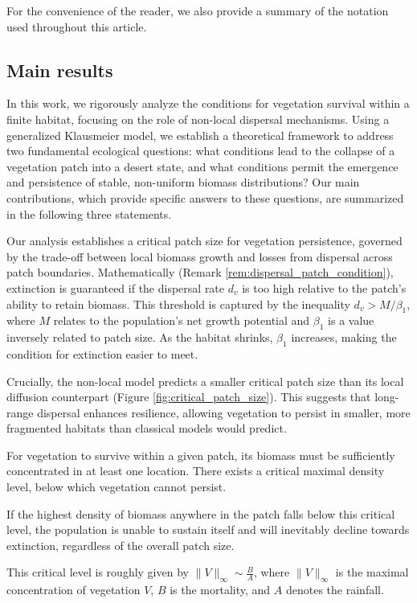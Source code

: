 \documentclass[review,onefignum,onetabnum]{SIAM-styles/siamart171218}
\begin{document}
For the convenience of the reader, we also provide a summary of the notation used throughout this article.

\subsection{Main results}

In this work, we rigorously analyze the conditions for vegetation survival within a finite habitat, focusing on the role of non-local dispersal mechanisms. Using a generalized Klausmeier model, we establish a theoretical framework to address two fundamental ecological questions: what conditions lead to the collapse of a vegetation patch into a desert state, and what conditions permit the emergence and persistence of stable, non-uniform biomass distributions? Our main contributions, which provide specific answers to these questions, are summarized in the following three statements.

\begin{main_contrib}
Our analysis establishes a critical patch size for vegetation persistence, governed by the trade-off between local biomass growth and losses from dispersal across patch boundaries. Mathematically (Remark \ref{rem:dispersal_patch_condition}), extinction is guaranteed if the dispersal rate $d_v$ is too high relative to the patch's ability to retain biomass. This threshold is captured by the inequality $d_v > M/\beta_1$, where $M$ relates to the population's net growth potential and $\beta_1$ is a value inversely related to patch size. As the habitat shrinks, $\beta_1$ increases, making the condition for extinction easier to meet.

Crucially, the non-local model predicts a smaller critical patch size than its local diffusion counterpart (Figure \ref{fig:critical_patch_size}). This suggests that long-range dispersal enhances resilience, allowing vegetation to persist in smaller, more fragmented habitats than classical models would predict.
\end{main_contrib}

\begin{main_contrib}
For vegetation to survive within a given patch, its biomass must be sufficiently concentrated in at least one location. There exists a critical maximal density level, below which vegetation cannot persist. 

If the highest density of biomass anywhere in the patch falls below this critical level, the population is unable to sustain itself and will inevitably decline towards extinction, regardless of the overall patch size.

This critical level is roughly given by $\|V\|_\infty \sim \frac{B}{A}$, where $\|V\|_\infty$ is the maximal concentration of vegetation $V$, $B$ is the mortality, and $A$ denotes the rainfall.
\end{main_contrib}
\end{document}
